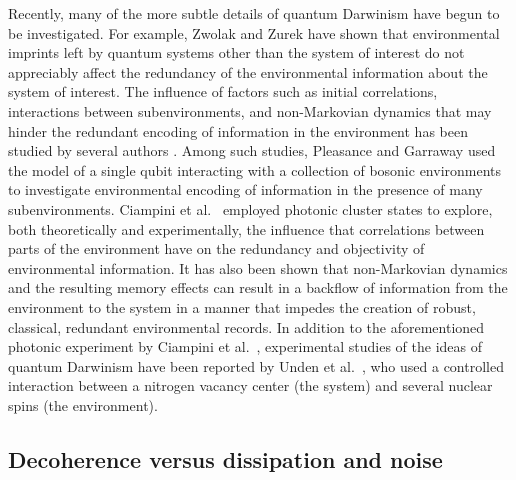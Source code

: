 \documentclass[3p,sort&compress,12pt]{elsarticle}
\begin{document}
Recently, many of the more subtle details of quantum Darwinism have begun to be investigated. For example, Zwolak and Zurek \cite{Zwolak:2017:mm} have shown that environmental imprints left by quantum systems other than the system of interest do not appreciably affect the redundancy of the environmental information about the system of interest. The influence of factors such as initial correlations, interactions between subenvironments, and non-Markovian dynamics that may hinder the redundant encoding of information in the environment has been studied by several authors \cite{Riedel:2012:un,Galve:2016:oo, Pleasance:2017:oo, Ciampini:2018:ii}. Among such studies, Pleasance and Garraway \cite{Pleasance:2017:oo} used the model of a single qubit interacting with a collection of bosonic environments to investigate environmental encoding of information in the presence of many subenvironments. Ciampini et al.\ \cite{Ciampini:2018:ii} employed photonic cluster states to explore, both theoretically and experimentally, the influence that correlations between parts of the environment have on the redundancy and objectivity of environmental information. It has also been shown \cite{Galve:2016:oo, Pleasance:2017:oo, Ciampini:2018:ii} that non-Markovian dynamics and the resulting memory effects can result in a backflow of information from the environment to the system in a manner that impedes the creation of robust, classical, redundant environmental records. In addition to the aforementioned photonic experiment by Ciampini et al.\ \cite{Ciampini:2018:ii}, experimental studies of the ideas of quantum Darwinism have been reported by Unden et al.\ \cite{Unden:2018:ia}, who used a controlled interaction between a nitrogen vacancy center (the system) and several nuclear spins (the environment). 

\subsection{\label{sec:decoh-vers-diss}Decoherence versus dissipation and noise}
\end{document}
